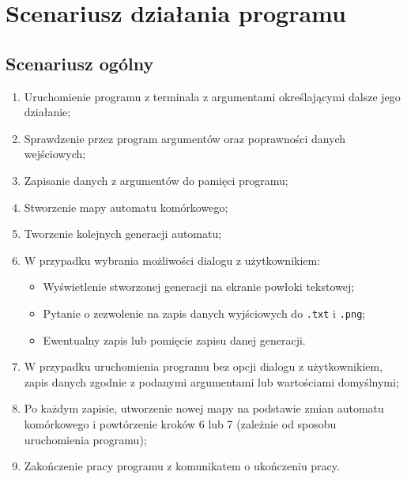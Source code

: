 \documentclass[a4paper,12pt]{article}
\begin{document}
\section{Scenariusz działania programu}
\subsection{Scenariusz ogólny}
\begin{enumerate}
\item Uruchomienie programu z terminala z argumentami określającymi dalsze jego działanie;
\item Sprawdzenie przez program argumentów oraz poprawności danych wejściowych;
\item Zapisanie danych z argumentów do pamięci programu;
\item Stworzenie mapy automatu komórkowego;
\item Tworzenie kolejnych generacji automatu;
\item W przypadku wybrania możliwości dialogu z użytkownikiem:
	\begin{itemize}
    \item Wyświetlenie stworzonej generacji na ekranie powłoki tekstowej;
	\item Pytanie o zezwolenie na zapis danych wyjściowych do \texttt{.txt} i \texttt{.png};
    \item Ewentualny zapis lub pomięcie zapisu danej generacji.
    \end{itemize}
\item W przypadku uruchomienia programu bez opcji dialogu z użytkownikiem, zapis danych zgodnie z podanymi argumentami lub wartościami domyślnymi;
\item Po każdym zapisie, utworzenie nowej mapy na podstawie zmian automatu komórkowego i powtórzenie kroków 6 lub 7 (zależnie od sposobu uruchomienia programu);
\item Zakończenie pracy programu z komunikatem o ukończeniu pracy.
\end{enumerate}
\end{document}
